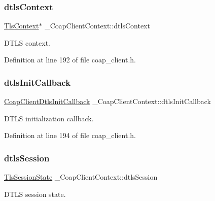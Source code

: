 \subsubsection{\texorpdfstring{dtls\+Context}{dtlsContext}}
{\footnotesize\ttfamily \hyperlink{tls_8h_ac09f7a286c0cdf9b07ee1edd107946f5}{Tls\+Context}$\ast$ \+\_\+\+Coap\+Client\+Context\+::dtls\+Context}



D\+T\+LS context. 



Definition at line 192 of file coap\+\_\+client.\+h.

\mbox{\label{struct__CoapClientContext_af5117c2fa48538f48c16067e852466ed}} 
\subsubsection{\texorpdfstring{dtls\+Init\+Callback}{dtlsInitCallback}}
{\footnotesize\ttfamily \hyperlink{coap__client_8h_a8d82e4052cfdce573905e9b9c6e302df}{Coap\+Client\+Dtls\+Init\+Callback} \+\_\+\+Coap\+Client\+Context\+::dtls\+Init\+Callback}



D\+T\+LS initialization callback. 



Definition at line 194 of file coap\+\_\+client.\+h.

\mbox{\label{struct__CoapClientContext_ab6a4cb76acef12019779865f50cc724a}} 
\subsubsection{\texorpdfstring{dtls\+Session}{dtlsSession}}
{\footnotesize\ttfamily \hyperlink{structTlsSessionState}{Tls\+Session\+State} \+\_\+\+Coap\+Client\+Context\+::dtls\+Session}



D\+T\+LS session state. 



